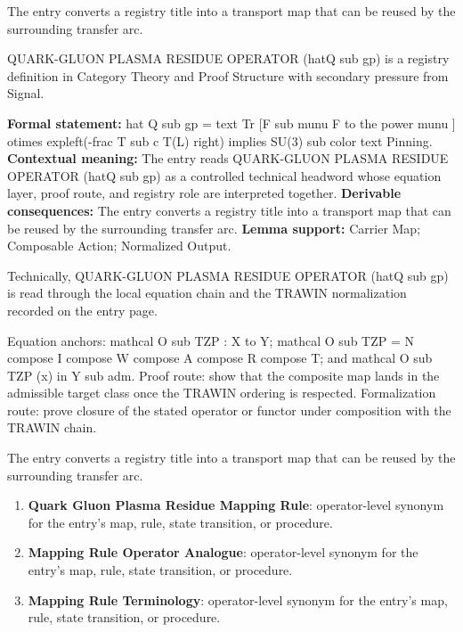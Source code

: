 The entry converts a registry title into a transport map that can be reused by the surrounding transfer arc.
\clearpage


\begingroup\small
{}
QUARK-GLUON PLASMA RESIDUE OPERATOR (hatQ sub gp) is a registry definition in Category Theory and Proof Structure with secondary pressure from Signal.

\begingroup\footnotesize\setlength{\emergencystretch}{3em}\sloppy
\textbf{Formal statement:} hat Q sub gp = text Tr [F sub munu F to the power munu ] otimes expleft(-frac T sub c T(L) right) implies SU(3) sub color text Pinning. \textbf{Contextual meaning:} The entry reads QUARK-GLUON PLASMA RESIDUE OPERATOR (hatQ sub gp) as a controlled technical headword whose equation layer, proof route, and registry role are interpreted together. \textbf{Derivable consequences:} The entry converts a registry title into a transport map that can be reused by the surrounding transfer arc. \textbf{Lemma support:} Carrier Map; Composable Action; Normalized Output.\par
\endgroup

Technically, QUARK-GLUON PLASMA RESIDUE OPERATOR (hatQ sub gp) is read through the local equation chain and the TRAWIN normalization recorded on the entry page.

Equation anchors: mathcal O sub TZP : X to Y; mathcal O sub TZP = N compose I compose W compose A compose R compose T; and mathcal O sub TZP (x) in Y sub adm. Proof route: show that the composite map lands in the admissible target class once the TRAWIN ordering is respected. Formalization route: prove closure of the stated operator or functor under composition with the TRAWIN chain.

The entry converts a registry title into a transport map that can be reused by the surrounding transfer arc.
\endgroup

\begin{enumerate}[leftmargin=1.6em,itemsep=6pt,topsep=4pt]
\item \textbf{Quark Gluon Plasma Residue Mapping Rule}: operator-level synonym for the entry's map, rule, state transition, or procedure.
\item \textbf{Mapping Rule Operator Analogue}: operator-level synonym for the entry's map, rule, state transition, or procedure.
\item \textbf{Mapping Rule Terminology}: operator-level synonym for the entry's map, rule, state transition, or procedure.
\end{enumerate}

